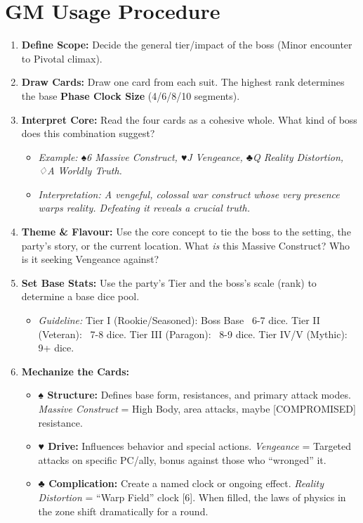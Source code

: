 \section{GM Usage Procedure}

\begin{enumerate}
    \item \textbf{Define Scope:} Decide the general tier/impact of the boss (Minor encounter to Pivotal climax).
    \item \textbf{Draw Cards:} Draw one card from each suit. The highest rank determines the base \textbf{Phase Clock Size} (4/6/8/10 segments).
    \item \textbf{Interpret Core:} Read the four cards as a cohesive whole. What kind of boss does this combination suggest?
    \begin{itemize}
        \item \emph{Example: ♠6 Massive Construct, ♥J Vengeance, ♣Q Reality Distortion, ♢A Worldly Truth.}
        \item \emph{Interpretation: A vengeful, colossal war construct whose very presence warps reality. Defeating it reveals a crucial truth.}
    \end{itemize}
    \item \textbf{Theme \& Flavour:} Use the core concept to tie the boss to the setting, the party's story, or the current location. What \emph{is} this Massive Construct? Who is it seeking Vengeance against?
    \item \textbf{Set Base Stats:} Use the party's Tier and the boss's scale (rank) to determine a base dice pool.
    \begin{itemize}
        \item \emph{Guideline:} Tier I (Rookie/Seasoned): Boss Base ~6-7 dice. Tier II (Veteran): ~7-8 dice. Tier III (Paragon): ~8-9 dice. Tier IV/V (Mythic): 9+ dice.
    \end{itemize}
    \item \textbf{Mechanize the Cards:}
    \begin{itemize}
        \item \textbf{♠ Structure:} Defines base form, resistances, and primary attack modes. \emph{Massive Construct} = High Body, area attacks, maybe [COMPROMISED] resistance.
        \item \textbf{♥ Drive:} Influences behavior and special actions. \emph{Vengeance} = Targeted attacks on specific PC/ally, bonus against those who ``wronged'' it.
        \item \textbf{♣ Complication:} Create a named clock or ongoing effect. \emph{Reality Distortion} = ``Warp Field'' clock [6]. When filled, the laws of physics in the zone shift dramatically for a round.

\end{itemize}
\end{enumerate}
